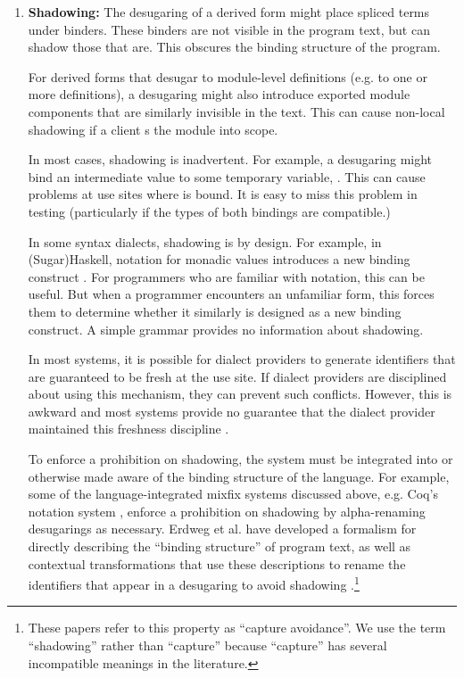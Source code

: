 {\begin{enumerate}
Systems that support the generation of editor plug-ins, such as Spoofax \cite{kats2010spoofax} and Sugarclipse for SugarJ \cite{Erdweg:2012:GLE}, can generate syntax coloring logic from an annotated grammar definition, which often give programmers some indication of where a spliced term occurs. However, there is no definitive information about segmentation in how the editor displays the derived form. (Moreover, these editor plug-ins can themselves conflict, even if the syntax itself is deterministic.)
\item \textbf{Shadowing:} The desugaring of a derived form might place spliced terms under binders. These binders are not visible in the program text, but can shadow those that are. This obscures the binding structure of the program.

For derived forms that desugar to module-level definitions (e.g. to one or more  definitions), a desugaring might also introduce exported module components that are similarly invisible in the text. This can cause non-local shadowing if a client s the module into scope.

In most cases, shadowing is inadvertent. For example, a desugaring might bind an intermediate value to some temporary variable, . This can cause problems at use sites where  is bound. It is easy to miss this problem in testing (particularly if the types of both bindings are compatible.)

In some syntax dialects, shadowing is by design. For example, in (Sugar)Haskell,  notation for monadic values introduces a new binding construct \cite{erdweg2012layout}. For programmers who {are} familiar with  notation, this can be useful. But when a programmer encounters an unfamiliar form, this forces them to determine whether it similarly is designed as a new binding construct. A simple grammar provides no information about shadowing.%

In most systems, it is possible for dialect providers to generate identifiers that are guaranteed to be fresh at the use site. If dialect providers are disciplined about using this mechanism, they can prevent such  conflicts. However, this is awkward and most systems provide no guarantee that the dialect provider maintained this freshness discipline \cite{conf/ecoop/ErdwegSD14}.

To enforce a prohibition on shadowing, the system must be integrated into or otherwise made aware of the binding structure of the language. For example, some of the language-integrated mixfix systems discussed above, e.g. Coq's notation system \cite{Coq:manual}, enforce a prohibition on shadowing by alpha-renaming desugarings as necessary. Erdweg et al. have developed a formalism for directly describing the ``binding structure'' of program text, as well as contextual transformations that use these descriptions to rename the identifiers that appear in a desugaring to avoid shadowing \cite{conf/ecoop/ErdwegSD14,conf/sle/RitschelE15}.\footnote{These papers refer to this property as ``capture avoidance''. We use the term ``shadowing'' rather than ``capture'' because ``capture'' has several incompatible meanings in the literature.}


\end{enumerate}}
